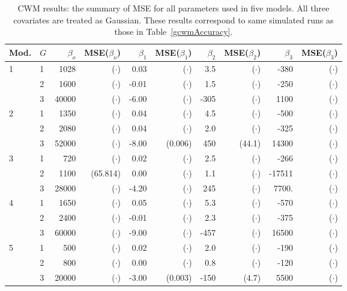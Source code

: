 \documentclass[12pt,letterpaper]{article}
\numberwithin{equation}{section}
\numberwithin{equation}{section}
\numberwithin{equation}{section}
\begin{document}
\begin{table}[!htb]
\centering
\caption{CWM results: the summary of MSE for all parameters used in five models. All three covariates are treated as Gaussian. These results correspond to same simulated runs as those in Table~\ref{gcwmAccuracy}.}
\label{my-label}
\begin{tabular}{ll|rrrrrrrr}
\hline
Mod. & $G$ & $\beta_o$ &  MSE($\beta_o$)   &  $\beta_1$ & MSE($\beta_1$)& $\beta_2$ &MSE($\beta_2$)   & $\beta_3$ &  MSE($\beta_3$)  \\
\hline
1     & 1         & 1028& ($\cdot$)   & 0.03&  ($\cdot$)   & 3.5&  ($\cdot$)    & -380&  ($\cdot$)    \\
      & 2         & 1600&  ($\cdot$)      & -0.01& ($\cdot$)  & 1.5& ($\cdot$)     & -250& ($\cdot$)  \\
      & 3         & 40000& ($\cdot$)     & -6.00& ($\cdot$)  & -305& ($\cdot$)  & 1100& ($\cdot$)    \\
\hline
2     & 1         & 1350& ($\cdot$)     & 0.04& ($\cdot$) & 4.5& ($\cdot$)    & -500& ($\cdot$)  \\
      & 2         & 2080&  ($\cdot$)    & 0.04& ($\cdot$)   & 2.0& ($\cdot$)     & -325& ($\cdot$)   \\
      & 3         & 52000&  ($\cdot$)     & -8.00& (0.006)  & 450& (44.1)   & 14300& ($\cdot$)  \\
\hline
3     & 1         & 720&  ($\cdot$)     & 0.02& ($\cdot$)   & 2.5& ($\cdot$)    & -266& ($\cdot$)    \\
      & 2         & 1100&  (65.814)     & 0.00& ($\cdot$)   & 1.1& ($\cdot$)     & -17511& ($\cdot$)  \\
      & 3         & 28000& ($\cdot$)   & -4.20& ($\cdot$)  & 245& ($\cdot$)   & 7700.& ($\cdot$)  \\
\hline
4     & 1         & 1650& ($\cdot$)    & 0.05& ($\cdot$)  & 5.3& ($\cdot$)    & -570& ($\cdot$)  \\
      & 2         & 2400&  ($\cdot$)     & -0.01& ($\cdot$)  & 2.3& ($\cdot$)    & -375& ($\cdot$)    \\
      & 3         & 60000&  ($\cdot$)     & -9.00& ($\cdot$)  & -457& ($\cdot$)  & 16500& ($\cdot$)   \\
\hline
5     & 1         & 500&  ($\cdot$)     & 0.02& ($\cdot$)   & 2.0& ($\cdot$)   & -190& ($\cdot$)  \\
      & 2         & 800&  ($\cdot$)      & 0.00& ($\cdot$)   & 0.8& ($\cdot$)    & -120& ($\cdot$)  \\
      & 3         & 20000&  ($\cdot$)     & -3.00& (0.003)  & -150& (4.7) & 5500& ($\cdot$) \\
\hline
\end{tabular}
\end{table}
\end{document}
